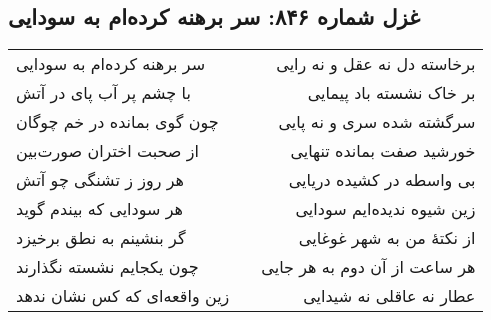 \begin{center}
\section*{غزل شماره ۸۴۶: سر برهنه کرده‌ام به سودایی}
\label{sec:846}
\begin{longtable}{l p{0.5cm} r}
سر برهنه کرده‌ام به سودایی
&&
برخاسته دل نه عقل و نه رایی
\\
با چشم پر آب پای در آتش
&&
بر خاک نشسته باد پیمایی
\\
چون گوی بمانده در خم چوگان
&&
سرگشته شده سری و نه پایی
\\
از صحبت اختران صورت‌بین
&&
خورشید صفت بمانده تنهایی
\\
هر روز ز تشنگی چو آتش
&&
بی واسطه در کشیده دریایی
\\
هر سودایی که بیندم گوید
&&
زین شیوه ندیده‌ایم سودایی
\\
گر بنشینم به نطق برخیزد
&&
از نکتهٔ من به شهر غوغایی
\\
چون یکجایم نشسته نگذارند
&&
هر ساعت از آن دوم به هر جایی
\\
زین واقعه‌ای که کس نشان ندهد
&&
عطار نه عاقلی نه شیدایی
\\
\end{longtable}
\end{center}
